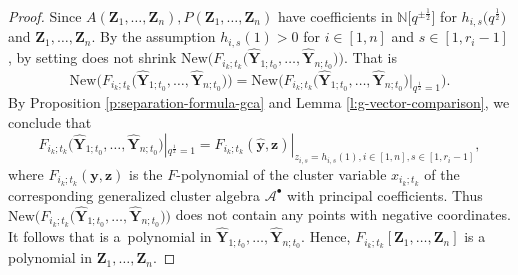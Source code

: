 \begin{proof}
 Since $A(\mathbf{Z}_{1},\dots,\mathbf{Z}_{n}),P(\mathbf{Z}_{1},\dots,\mathbf{Z}_{n})$ have coefficients in $\mathbb{N}\big[q^{\pm\frac{1}{2}}\big]$ for $h_{i,s}\bigl(q^{\frac{1}{2}}\bigr)$ and $\mathbf{Z}_{1},\dots,\mathbf{Z}_{n}$. By the assumption $h_{i,s}(1)>0$ for $i\in[1,n]$ and $s\in[1,r_{i}-1]$, by setting  does not shrink $\text{New}\bigl(F_{i_{k};t_{k}}\bigl(\mathbf{\hat{Y}}_{1;t_{0}},\dots,\mathbf{\hat{Y}}_{n;t_{0}}\bigr)\bigr)$. That is
 \[
 \text{New}\bigl(F_{i_{k};t_{k}}\bigl(\mathbf{\hat{Y}}_{1;t_{0}},\dots,\mathbf{\hat{Y}}_{n;t_{0}}\bigr)\bigr)
 =\text{New}\bigl(F_{i_{k};t_{k}}\bigl(\mathbf{\hat{Y}}_{1;t_{0}},\dots,\mathbf{\hat{Y}}_{n;t_{0}}\bigr)|_{q^{\frac{1}{2}}=1}\bigr).\]
By Proposition \ref{p:separation-formula-gca} and Lemma \ref{l:g-vector-comparison}, we conclude that \[F_{i_{k};t_{k}}\bigl(\mathbf{\hat{Y}}_{1;t_{0}},\dots,\mathbf{\hat{Y}}_{n;t_{0}}\bigr)|_{q^{\frac{1}{2}}=1}=F_{i_k;t_k}(\mathbf{\hat{y}},\mathbf{z})|_{z_{i,s}=h_{i,s}(1),i\in [1,n],s\in [1,r_i-1]},\] where $F_{i_k;t_k}(\mathbf{y},\mathbf{z})$ is the $F$-polynomial of the cluster variable $x_{i_k;t_k}$ of the corresponding generalized cluster algebra $\mathcal{A}^\bullet$ with principal coefficients.
 Thus $\text{New}\bigl(F_{i_{k};t_{k}}\bigl(\mathbf{\hat{Y}}_{1;t_{0}},\dots,\mathbf{\hat{Y}}_{n;t_{0}}\bigr)\bigr)$ does not contain any points with negative coordinates. It follows that  is a~polynomial in $\mathbf{\hat{Y}}_{1;t_{0}},\dots,\mathbf{\hat{Y}}_{n;t_{0}}$. Hence, $F_{i_{k};t_{k}}[\mathbf{Z}_1,\dots,\mathbf{Z}_{n}]$ is a polynomial in $\mathbf{Z}_{1},\dots,\mathbf{Z}_{n}$.
\end{proof}

